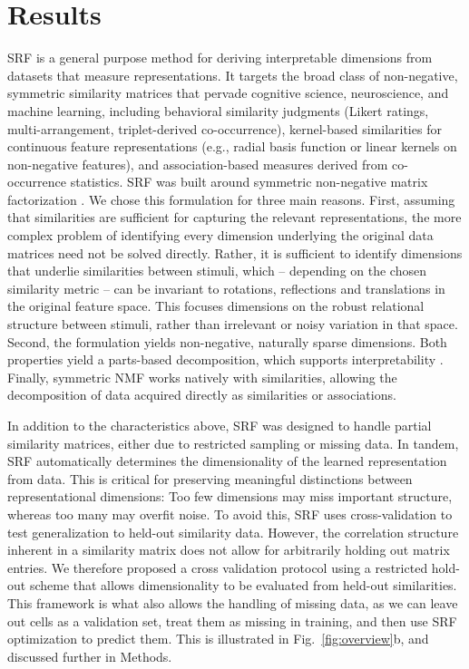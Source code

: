 \documentclass{article}
\begin{document}
\section{Results}
\label{sec:result}
SRF is a general purpose method for deriving interpretable dimensions from datasets that measure representations. It targets the broad class of non-negative, symmetric similarity matrices that pervade cognitive science, neuroscience, and machine learning, including behavioral similarity judgments (Likert ratings, multi-arrangement, triplet-derived co-occurrence), kernel-based similarities for continuous feature representations (e.g., radial basis function or linear kernels on non-negative features), and association-based measures derived from co-occurrence statistics. SRF was built around symmetric non-negative matrix factorization \citep[SNMF,][]{Ding2005, Kuang2012}. We chose this formulation for three main reasons. First, assuming that similarities are sufficient for capturing the relevant representations, the more complex problem of identifying every dimension underlying the original data matrices need not be solved directly. Rather, it is sufficient to identify dimensions that underlie similarities between stimuli, which -- depending on the chosen similarity metric -- can be invariant to rotations, reflections and translations in the original feature space. This focuses dimensions on the robust relational structure between stimuli, rather than irrelevant or noisy variation in that space.
Second, the formulation yields non-negative, naturally sparse dimensions. Both properties yield a parts-based decomposition, which supports interpretability \citep{Hebart2020, Fyshe2015}. Finally, symmetric NMF works natively with similarities, allowing the decomposition of data acquired directly as similarities or associations.

In addition to the characteristics above, SRF was designed to handle partial similarity matrices, either due to restricted sampling or missing data. In tandem, SRF automatically determines the dimensionality of the learned representation from data. This is critical for preserving meaningful distinctions between representational dimensions: Too few dimensions may miss important structure, whereas too many may overfit noise. To avoid this, SRF uses cross-validation to test generalization to held-out similarity data. However, the correlation structure inherent in a similarity matrix does not allow for arbitrarily holding out matrix entries. We therefore proposed a cross validation protocol using a restricted hold-out scheme that allows dimensionality to be evaluated from held-out similarities. This framework is what also allows the handling of missing data, as  we can leave out cells as a validation set, treat them as missing in training, and then use SRF optimization to predict them. This is illustrated in Fig.~\ref{fig:overview}b, and discussed further in Methods.
\end{document}
